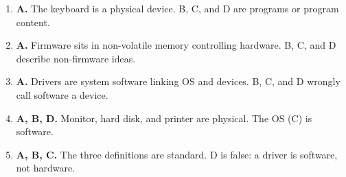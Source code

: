 \documentclass[11pt]{article}
\begin{document}
\begin{enumerate}[label=\textbf{Q\arabic*.}, leftmargin=*]
\item \textbf{A.} The keyboard is a physical device. B, C, and D are programs or program content.
\item \textbf{A.} Firmware sits in non-volatile memory controlling hardware. B, C, and D describe non-firmware ideas.
\item \textbf{A.} Drivers are system software linking OS and devices. B, C, and D wrongly call software a device.
\item \textbf{A, B, D.} Monitor, hard disk, and printer are physical. The OS (C) is software.
\item \textbf{A, B, C.} The three definitions are standard. D is false: a driver is software, not hardware.
\end{enumerate}
\def\JKSSBLessonID{17}\def\JKSSBAnswers{1}
\end{document}
